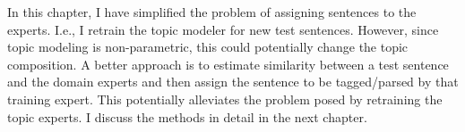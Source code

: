 In this chapter, I have simplified the problem of assigning sentences to the experts. I.e., I retrain the topic modeler for new test sentences. However, since topic modeling is non-parametric, this could potentially change the topic composition. A better approach is to estimate similarity between a test sentence and the domain experts and then assign the sentence to be tagged/parsed by that training expert. This potentially alleviates the problem posed by retraining the topic experts. I discuss the methods in detail in the next chapter.  








